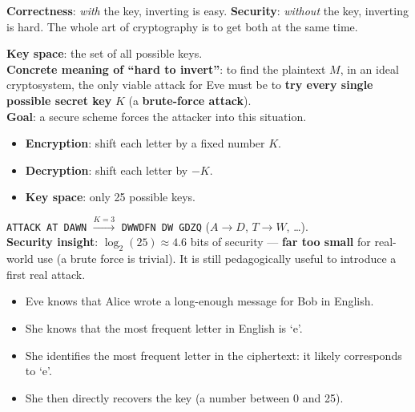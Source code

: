 \begin{rembox}[title=Two requirements that pull in opposite directions]
\textbf{Correctness}: \emph{with} the key, inverting is easy. \textbf{Security}:
\emph{without} the key, inverting is hard. The whole art of cryptography is to get both
at the same time.
\end{rembox}

\begin{defnbox}[title=Hard to invert: the key space and brute force]
\textbf{Key space}: the set of all possible keys. \\
\textbf{Concrete meaning of ``hard to invert''}: to find the plaintext $M$, in an ideal
cryptosystem, the only viable attack for Eve must be to \textbf{try every single possible
secret key} $K$ (a \textbf{brute-force attack}). \\
\textbf{Goal}: a secure scheme forces the attacker into this situation.
\end{defnbox}

\begin{defnbox}[title=Caesar's cipher]
\begin{itemize}
  \item \textbf{Encryption}: shift each letter by a fixed number $K$.
  \item \textbf{Decryption}: shift each letter by $-K$.
  \item \textbf{Key space}: only 25 possible keys.
\end{itemize}
\end{defnbox}

\begin{exbox}[title={Caesar with $K = 3$}]
\texttt{ATTACK AT DAWN} $\xrightarrow{K=3}$ \texttt{DWWDFN DW GDZQ}
($A \to D$, $T \to W$, \ldots). \\
\textbf{Security insight}: $\log_2(25) \approx 4.6$ bits of security --- \textbf{far too
small} for real-world use (a brute force is trivial). It is still pedagogically useful to
introduce a first real attack.
\end{exbox}

\begin{defnbox}[title=Frequency analysis attack]
\begin{itemize}
  \item Eve knows that Alice wrote a long-enough message for Bob in English.
  \item She knows that the most frequent letter in English is `e'.
  \item She identifies the most frequent letter in the ciphertext: it likely corresponds
        to `e'.
  \item She then directly recovers the key (a number between 0 and 25).
\end{itemize}
\end{defnbox}

